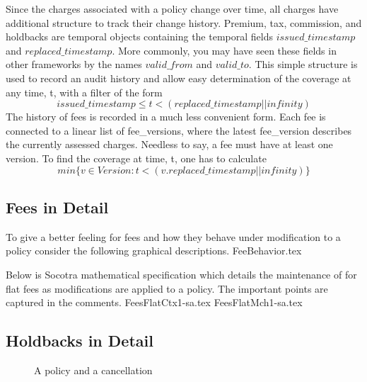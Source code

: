 Since the charges associated with a policy change over time, all charges have additional structure to track their
change history. Premium, tax, commission, and holdbacks are temporal objects containing the temporal fields $issued\_timestamp$ and $replaced\_timestamp$.
More commonly, you may have seen these fields in other frameworks by the names $valid\_from$ and
$valid\_to$. This simple structure is used to record an audit history and allow easy determination of the
coverage at any time, t, with a filter of the form
\begin{equation*}
issued\_timestamp \leq t < (replaced\_timestamp || infinity)
\end{equation*}
The history of fees is recorded in a much less convenient form. Each fee is connected to a linear list of fee\_versions, where
the latest fee\_version describes the currently assessed charges. Needless to say, a fee must have at least one version.
To find the coverage at time, t, one has to calculate
\begin{equation*}
min \lbrace v \in Version : t < (v.replaced\_timestamp || infinity) \rbrace
\end{equation*}

\subsection{Fees in Detail}
To give a better feeling for fees and how they behave under modification to a policy consider the following
graphical descriptions.
{FeeBehavior.tex}
\newpage

Below is Socotra mathematical specification which details the maintenance of for flat fees as modifications are applied to a
policy. The important points are captured in the comments.
{FeesFlatCtx1-sa.tex}
{FeesFlatMch1-sa.tex}

\subsection{Holdbacks in Detail}

\begin{figure}[ht]
  \caption{
    A policy and a cancellation
  }
  \label{fig:3:2}
\end{figure}

